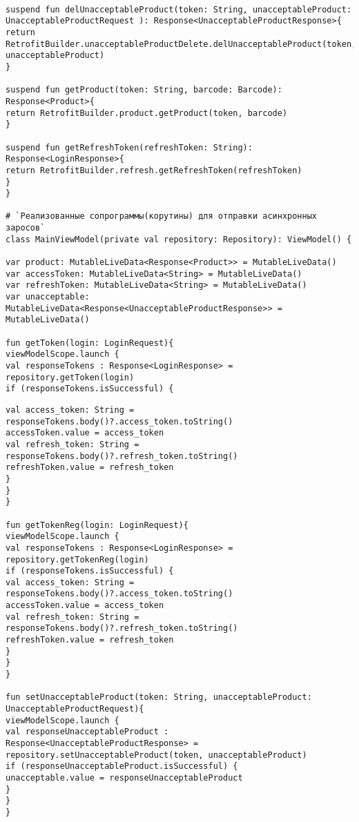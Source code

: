 \begin{lstlisting}

suspend fun delUnacceptableProduct(token: String, unacceptableProduct: UnacceptableProductRequest ): Response<UnacceptableProductResponse>{
return RetrofitBuilder.unacceptableProductDelete.delUnacceptableProduct(token, unacceptableProduct)
}

suspend fun getProduct(token: String, barcode: Barcode): Response<Product>{
return RetrofitBuilder.product.getProduct(token, barcode)
}

suspend fun getRefreshToken(refreshToken: String): Response<LoginResponse>{
return RetrofitBuilder.refresh.getRefreshToken(refreshToken)
}
}

# `Реализованные сопрограммы(корутины) для отправки асинхронных заросов`
class MainViewModel(private val repository: Repository): ViewModel() {

var product: MutableLiveData<Response<Product>> = MutableLiveData()
var accessToken: MutableLiveData<String> = MutableLiveData()
var refreshToken: MutableLiveData<String> = MutableLiveData()
var unacceptable: MutableLiveData<Response<UnacceptableProductResponse>> = MutableLiveData()

fun getToken(login: LoginRequest){
viewModelScope.launch {
val responseTokens : Response<LoginResponse> = repository.getToken(login)
if (responseTokens.isSuccessful) {
\end{lstlisting}
\clearpage
{}
\begin{lstlisting}
val access_token: String = responseTokens.body()?.access_token.toString()
accessToken.value = access_token
val refresh_token: String = responseTokens.body()?.refresh_token.toString()
refreshToken.value = refresh_token
}
}
}

fun getTokenReg(login: LoginRequest){
viewModelScope.launch {
val responseTokens : Response<LoginResponse> = repository.getTokenReg(login)
if (responseTokens.isSuccessful) {
val access_token: String = responseTokens.body()?.access_token.toString()
accessToken.value = access_token
val refresh_token: String = responseTokens.body()?.refresh_token.toString()
refreshToken.value = refresh_token
}
}
}

fun setUnacceptableProduct(token: String, unacceptableProduct: UnacceptableProductRequest){
viewModelScope.launch {
val responseUnacceptableProduct : Response<UnacceptableProductResponse> = repository.setUnacceptableProduct(token, unacceptableProduct)
if (responseUnacceptableProduct.isSuccessful) {
unacceptable.value = responseUnacceptableProduct
}
}
}
\end{lstlisting}
